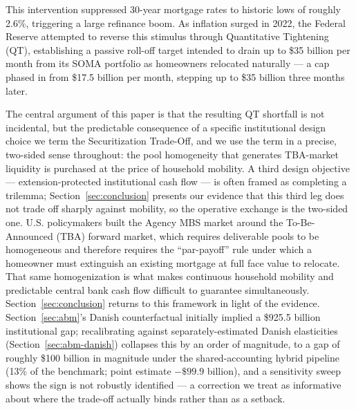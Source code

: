 \documentclass[12pt]{article}
\begin{document}
This intervention suppressed 30-year mortgage rates to historic lows of roughly 2.6\%, triggering a large refinance boom. As inflation surged in 2022, the Federal Reserve attempted to reverse this stimulus through Quantitative Tightening (QT), establishing a passive roll-off target intended to drain up to \$35 billion per month from its SOMA portfolio as homeowners relocated naturally --- a cap phased in from \$17.5 billion per month, stepping up to \$35 billion three months later.

The central argument of this paper is that the resulting QT shortfall is not incidental, but the predictable consequence of a specific institutional design choice we term the Securitization Trade-Off, and we use the term in a precise, two-sided sense throughout: the pool homogeneity that generates TBA-market liquidity is purchased at the price of household mobility. A third design objective --- extension-protected institutional cash flow --- is often framed as completing a trilemma; Section~\ref{sec:conclusion} presents our evidence that this third leg does not trade off sharply against mobility, so the operative exchange is the two-sided one. U.S. policymakers built the Agency MBS market around the To-Be-Announced (TBA) forward market, which requires deliverable pools to be homogeneous and therefore requires the ``par-payoff'' rule under which a homeowner must extinguish an existing mortgage at full face value to relocate. That same homogenization is what makes continuous household mobility and predictable central bank cash flow difficult to guarantee simultaneously. Section~\ref{sec:conclusion} returns to this framework in light of the evidence. Section~\ref{sec:abm}'s Danish counterfactual initially implied a \$925.5 billion institutional gap; recalibrating against separately-estimated Danish elasticities (Section~\ref{sec:abm-danish}) collapses this by an order of magnitude, to a gap of roughly \$100 billion in magnitude under the shared-accounting hybrid pipeline (13\% of the benchmark; point estimate $-\$99.9$ billion), and a sensitivity sweep shows the sign is not robustly identified --- a correction we treat as informative about where the trade-off actually binds rather than as a setback.
\end{document}
